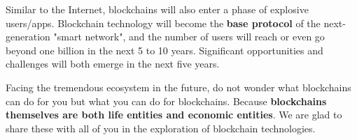 Similar to the Internet, blockchains will also enter a phase of explosive users/apps. Blockchain technology will become the \textbf{base protocol} of the next-generation "smart network", and the number of users will reach or even go beyond one billion in the next 5 to 10 years. Significant opportunities and challenges will both emerge in the next five years.


Facing the tremendous ecosystem in the future, do not wonder what blockchains can do for you but what you can do for blockchains. Because \textbf{blockchains themselves are both life entities and economic entities}. We are glad to share these with all of you in the exploration of blockchain technologies.

